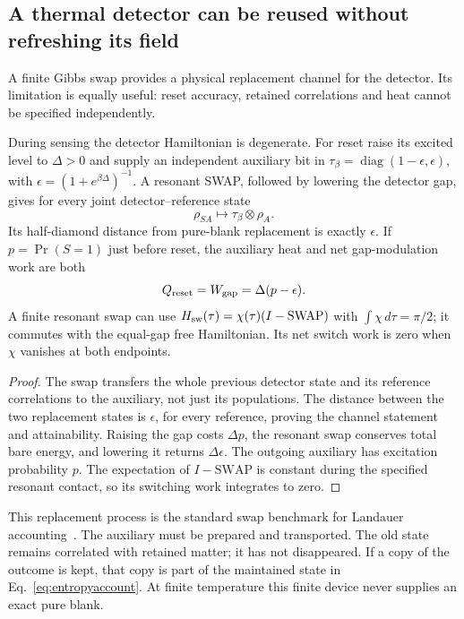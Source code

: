 \subsection{A thermal detector can be reused without refreshing its field}
\label{sec:thermal-sensor-renewal}

A finite Gibbs swap provides a physical replacement channel for the detector.
Its limitation is equally useful: reset accuracy, retained correlations and
heat cannot be specified independently.

\begin{proposition}
\label{prop:thermal-detector-reset}
During sensing the detector Hamiltonian is degenerate. For reset raise its
excited level to $\Delta>0$ and supply an independent auxiliary bit in
$\tau_\beta=\operatorname{diag}(1-\epsilon,\epsilon)$, with
$\epsilon=(1+e^{\beta\Delta})^{-1}$. A resonant SWAP, followed by lowering
the detector gap, gives for every joint detector--reference state
\[
 \rho_{SA}\longmapsto\tau_\beta\otimes\rho_A .
\]
Its half-diamond distance from pure-blank replacement is exactly $\epsilon$.
If $p=\Pr(S=1)$ just before reset, the auxiliary heat and net gap-modulation
work are both
\begin{equation}\label{eq:thermal-sensor-reset-charge}
 Q_{\rm reset}=W_{\rm gap}=\Delta(p-\epsilon).
\end{equation}
A finite resonant swap can use
$H_{\rm sw}(\tau)=\chi(\tau)(I-\mathrm{SWAP})$ with
$\int\chi\,d\tau=\pi/2$; it commutes with the equal-gap free Hamiltonian.
Its net switch work is zero when $\chi$ vanishes at both endpoints.
\end{proposition}
\begin{proof}
The swap transfers the whole previous detector state and its reference
correlations to the auxiliary, not just its populations.
The distance between the two replacement states is $\epsilon$, for every
reference, proving the channel statement and attainability.
Raising the gap costs $\Delta p$, the resonant swap conserves total bare energy,
and lowering it returns $\Delta\epsilon$.
The outgoing auxiliary has excitation probability $p$.
The expectation of $I-\mathrm{SWAP}$ is constant during the specified
resonant contact, so its switching work integrates to zero.
\end{proof}
This replacement process is the standard swap benchmark for Landauer
accounting~\cite[Example~1 and Sec.~3.3]{ReebWolf2014}.
The auxiliary must be prepared and transported. The old state remains
correlated with retained matter; it has not disappeared.
If a copy of the outcome is kept, that copy is part of the maintained state
in Eq.~\eqref{eq:entropyaccount}.
At finite temperature this finite device never supplies an exact pure blank.

